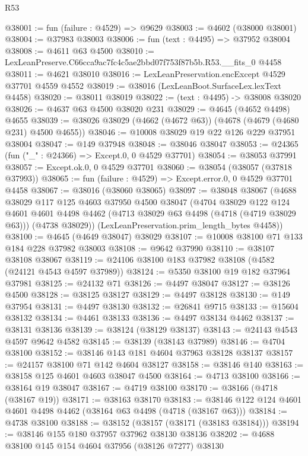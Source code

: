 \begin{lexlean}{R53}
\begin{coremodule}
@38001 := fun (failure : @4529) => @9629
@38003 := @4602 (@38000 @38001)
@38004 := @37983 @38003
@38006 := fun (text : @4495) => @37952 @38004
@38008 := @4611 @63 @4500
@38010 := LexLeanPreserve.C66cca9ac7fc4c5ae2bbd07f753f87b5b.R53.__fits_0 @4458
@38011 := @4621 @38010
@38016 := LexLeanPreservation.encExcept @4529 @37701 @4559 @4552
@38019 := @38016 (LexLeanBoot.SurfaceLex.lexText @4458)
@38020 := @38011 @38019
@38022 := (text : @4495) -> @38008 @38020
@38026 := @4637 @63 @4500 @38020 @231
@38029 := @4645 (@4652 @4498) @4655
@38039 := @38026 @38029 (@4662 (@4672 @63)) (@4678 (@4679 (@4680 @231) @4500 @4655))
@38046 := @10008 @38029 @19 @22 @126 @229 @37951 @38004
@38047 := @149 @37948
@38048 := @38046 @38047
@38053 := @24365 (fun ("_" : @24366) => Except.{0, 0} @4529 @37701)
@38054 := @38053 @37991
@38057 := Except.ok.{0, 0} @4529 @37701
@38060 := @38054 (@38057 (@37818 @37993))
@38065 := fun (failure : @4529) => Except.error.{0, 0} @4529 @37701 @4458
@38067 := @38016 (@38060 @38065)
@38097 := @38048
    @38067
    (@4688
      @38029
      @117
      @125
      @4603
      @37950
      @4500
      @38047
      (@4704
        @38029
        @122
        @124
        @4601
        @4601
        @4498
        @4462
        (@4713 @38029 @63 @4498 (@4718 (@4719 @38029 @63)))
        (@4738 @38029))
      (LexLeanPreservation.prim_length_bytes @4458))
@38100 := @4645 (@4649 @38047) @38029
@38107 := @10008 @38100 @71 @133 @184 @228 @37982 @38003
@38108 := @9642 @37990
@38110 := @38107 @38108 @38067
@38119 := @24106 @38100 @183 @37982 @38108 (@4582 (@24121 @4543 @4597 @37989))
@38124 := @5350 @38100 @19 @182 @37964 @37981
@38125 := @24132 @71
@38126 := @4497 @38047
@38127 := @38126 @4500
@38128 := @38125 @38127
@38129 := @4497 @38128
@38130 := @149 @37954
@38131 := @4497 @38130
@38132 := @26841 @9715
@38133 := @15604 @38132
@38134 := @4461 @38133
@38136 := @4497 @38134 @4462
@38137 := @38131 @38136
@38139 := @38124 (@38129 @38137)
@38143 := @24143 @4543 @4597 @9642 @4582
@38145 := @38139 (@38143 @37989)
@38146 := @4704 @38100
@38152 := @38146 @143 @181 @4604 @37963 @38128 @38137
@38157 := @24157 @38100 @71 @142 @4604 @38127
@38158 := @38146 @140
@38163 := @38158 @125 @4601 @4603 @38047 @4500
@38164 := @4713 @38100
@38166 := @38164 @19 @38047
@38167 := @4719 @38100
@38170 := @38166 (@4718 (@38167 @19))
@38171 := @38163 @38170
@38183 := @38146 @122 @124 @4601 @4601 @4498 @4462 (@38164 @63 @4498 (@4718 (@38167 @63)))
@38184 := @4738 @38100
@38188 := @38152 (@38157 (@38171 (@38183 @38184)))
@38194 := @38146 @155 @180 @37957 @37962 @38130 @38136
@38202 := @4688 @38100 @145 @154 @4604 @37956 (@38126 @7277) @38130

\end{coremodule}
\end{lexlean}
